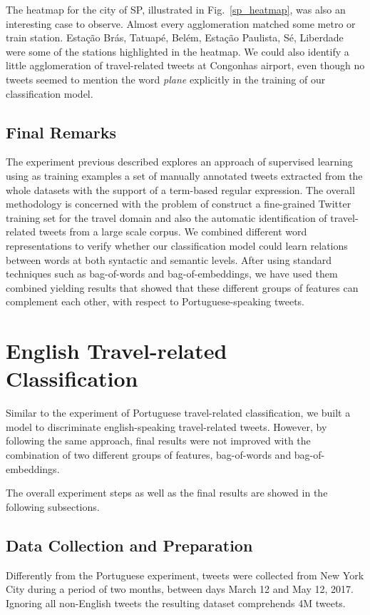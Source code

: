 The heatmap for the city of SP, illustrated in Fig.~\ref{sp_heatmap}, was also an interesting case to observe. Almost every agglomeration matched some metro or train station. Estação Brás, Tatuapé, Belém, Estação Paulista, Sé, Liberdade were some of the stations highlighted in the heatmap. We could also identify a little agglomeration of travel-related tweets at Congonhas airport, even though no tweets seemed to mention the word \textit{plane} explicitly in the training of our classification model.

\subsection{Final Remarks}
The experiment previous described explores an approach of supervised learning using as training examples a set of manually annotated tweets extracted from the whole datasets with the support of a term-based regular expression. The overall methodology is concerned with the problem of construct a fine-grained Twitter training set for the travel domain and also the automatic identification of travel-related tweets from a large scale corpus. We combined different word representations to verify whether our classification model could learn relations between words at both syntactic and semantic levels. After using standard techniques such as bag-of-words and bag-of-embeddings, we have used them combined yielding results that showed that these different groups of features can complement each other, with respect to Portuguese-speaking tweets.

\section{English Travel-related Classification}

Similar to the experiment of Portuguese travel-related classification, we built a model to discriminate english-speaking travel-related tweets. However, by following the same approach, final results were not improved with the combination of two different groups of features, bag-of-words and bag-of-embeddings.

The overall experiment steps as well as the final results are showed in the following subsections.

\subsection{Data Collection and Preparation}
Differently from the Portuguese experiment, tweets were collected from New York City during a period of two months, between days March 12 and May 12, 2017. Ignoring all non-English tweets the resulting dataset comprehends 4M tweets.


